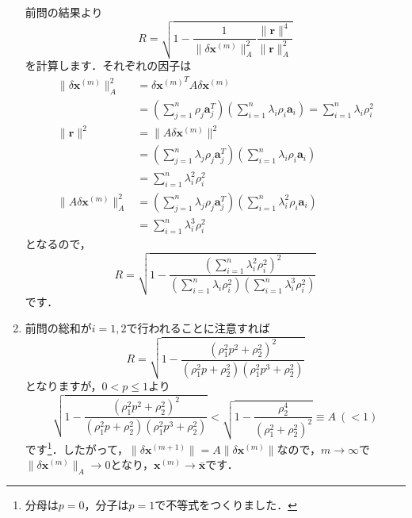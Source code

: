 \documentclass[a4paper,pdflatex,ja=standard]{bxjsarticle}
\begin{document}
\begin{enumerate}
  前問の結果より
  \begin{equation}
    R
    =
    \sqrt{
      1
      -
      \frac{1}{\|\delta\bm{x}^{(m)}\|_{A}^2}
      \frac{\|\bm{r}\|^4}{\|\bm{r}\|_A^2}      
    }
  \end{equation}
  を計算します．それぞれの因子は
  \begin{align}
    \|\delta\bm{x}^{(m)}\|_{A}^2
    &=
    {\delta\bm{x}^{(m)}}^T
    A
    \delta\bm{x}^{(m)}
    \nonumber
    \\
    &=
    \left( \sum_{j=1}^{n}\rho_j\bm{a}_j^T \right)
    \left( \sum_{i=1}^{n}\lambda_i\rho_i\bm{a}_i \right)
    =
    \sum_{i=1}^{n}
    \lambda_i\rho_i^2
    \\
    \|\bm{r}\|^2
    &=
    \|A\delta\bm{x}^{(m)}\|^2
    \nonumber
    \\
    &=
    \left( \sum_{j=1}^{n}\lambda_j\rho_j\bm{a}_j^T \right)
    \left( \sum_{i=1}^{n}\lambda_i\rho_i\bm{a}_i \right)
    \nonumber
    \\
    &=
    \sum_{i=1}^{n}
    \lambda_i^2\rho_i^2
    \\    
    \|A\delta\bm{x}^{(m)}\|_A^2
    &=
    \left( \sum_{j=1}^{n}\lambda_j\rho_j\bm{a}_j^T \right)
    \left( \sum_{i=1}^{n}\lambda_i^2\rho_i\bm{a}_i \right)    
    \nonumber
    \\
    &=
    \sum_{i=1}^{n}
    \lambda_i^3\rho_i^2
  \end{align}
  となるので，
  \begin{equation}
    R
    =
    \sqrt{
      1
      -
      \dfrac{{\displaystyle \left( \sum_{i=1}^{n}
      \lambda_i^2\rho_i^2 \right)^2}}{{ \displaystyle
        \left( 
          \sum_{i=1}^{n}
          \lambda_i\rho_i^2 \right)
        \left( 
          \sum_{i=1}^{n}
          \lambda_i^3\rho_i^2 \right)}
      }
    }
  \end{equation}
  です．


  \item 

  前問の総和が$i=1,2$で行われることに注意すれば
  \begin{equation}
    R
    =
    \sqrt{
      1
      -
      \dfrac{
        \left( \rho_1^2p^2+\rho_2^2 \right)^2
      }{
        \left( \rho_1^2 p+\rho_2^2 \right)
        \left( \rho_1^2p^3+\rho_2^2 \right)
      }
    }
  \end{equation}
  となりますが，$0<p\leq1$より
  \begin{equation}
    \sqrt{
      1
      -
      \dfrac{
        \left( \rho_1^2p^2+\rho_2^2 \right)^2
      }{
        \left( \rho_1^2 p+\rho_2^2 \right)
        \left( \rho_1^2p^3+\rho_2^2 \right)
      }
    }
    <    
    \sqrt{
      1
      -
      \dfrac{
        \rho_2^4
      }{
        \left( \rho_1^2+\rho_2^2 \right)^2
      }
    }
    \equiv
    A
    \ 
    (<1)
  \end{equation}
  です\footnote{
    分母は$p=0$，分子は$p=1$で不等式をつくりました．
  }．したがって，$\|\delta\bm{x}^{(m+1)}\|=A\|\delta\bm{x}^{(m)}\|$なので，$m\rightarrow\infty$で$\|\delta\bm{x}^{(m)}\|_A\rightarrow0$となり，$\bm{x}^{(m)}\rightarrow\bar{\bm{x}}$です．


\end{enumerate}
\end{document}
